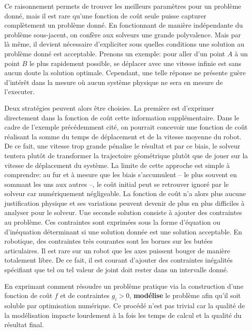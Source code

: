 Ce raisonnement permets de trouver les meilleurs paramètres pour un
problème donné, mais il est rare qu'une fonction de coût seule puisse
capturer complètement un problème donné. En fonctionnant de manière
indépendante du problème sous-jacent, on confère aux solveurs une
grande polyvalence. Mais par là même, il devient nécessaire
d'expliciter sous quelles conditions une solution au problème donné
est acceptable. Prenons un exemple: pour aller d'un point $A$ à un
point $B$ le plus rapidement possible, se déplacer avec une vitesse
infinie est sans aucun doute la solution optimale. Cependant, une
telle réponse ne présente guère d'intérêt dans la mesure où aucun
système physique ne sera en mesure de l'executer.


Deux stratégies peuvent alors être choisies. La première est
d'exprimer directement dans la fonction de coût cette information
supplémentaire. Dans le cadre de l'exemple précédemment cité, on
pourrait concevoir une fonction de coût réalisant la somme du temps de
déplacement et de la vitesse moyenne du robot. De ce fait, une vitesse
trop grande pénalise le résultat et par ce biais, le solveur tentera
plutôt de transformer la trajectoire géométrique plutôt que de jouer
sur la vitesse de déplacement du système. La limite de cette approche
est simple à comprendre: au fur et à mesure que les biais s'accumulent
-- le plus souvent en sommant les uns aux autres --, le coût initial
peut se retrouver ignoré par le solveur car numériquement
négligeable. La fonction de coût n'a alors plus aucune justification
physique et ses variations peuvent devenir de plus en plus difficiles
à analyser pour le solveur.  Une seconde solution consiste à ajouter
des contraintes au problème. Ces contraintes sont exprimées sous la
forme d'équation ou d'inéquation déterminant si une solution donnée
est une solution acceptable. En robotique, des contraintes très
courantes sont les bornes sur les butées articulaires. Il est rare sur
un robot que les axes puissent bouger de manière totalement libre. De
ce fait, il est courant d'ajouter des contraintes inégalités
spécifiant que tel ou tel valeur de joint doit rester dans un
intervalle donné.


En exprimant comment résoudre un problème pratique via la construction
d'une fonction de coût $f$ et de contraintes $g_i > 0$,
\textbf{modélise} le problème afin qu'il soit soluble par optimisation
numérique. Ce procédé n'est pas trivial car la qualité de la
modélisation impacte lourdement à la fois les temps de calcul et la
qualité du résultat final.



